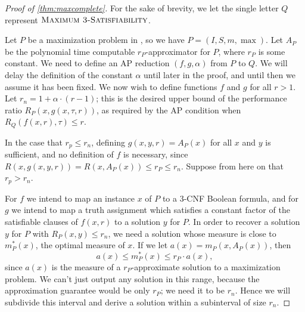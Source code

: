 \documentclass[]{article}
\theoremstyle{plain}
\theoremstyle{definition}
\begin{document}
\begin{proof}[Proof of \autoref{thm:maxcomplete}]
  For the sake of brevity, we let the single letter $Q$ represent $\textsc{Maximum 3-Satisfiability}$.

  Let $P$ be a maximization problem in \APX, so we have $P = (I, S, m, \max)$.
  Let $A_P$ be the polynomial time computable $r_P$-approximator for $P$, where $r_P$ is some constant.
  We need to define an AP reduction $(f, g, \alpha)$ from $P$ to $Q$.
  We will delay the definition of the constant $\alpha$ until later in the proof, and until then we assume it has been fixed.
  We now wish to define functions $f$ and $g$ for all $r > 1$.
  Let $r_n = 1 + \alpha \cdot (r - 1)$; this is the desired upper bound of the performance ratio $R_P(x, g(x, \tau, r))$, as required by the AP condition when $R_Q(f(x, r), \tau) \leq r$.

  In the case that $r_p \leq r_n$, defining $g(x, y, r) = A_P(x)$ for all $x$ and $y$ is sufficient, and no definition of $f$ is necessary, since $R(x, g(x, y, r)) = R(x, A_P(x)) \leq r_P \leq r_n$.
  Suppose from here on that $r_p > r_n$.

  For $f$ we intend to map an instance $x$ of $P$ to a 3-CNF Boolean formula, and for $g$ we intend to map a truth assignment which satisfies a constant factor of the satisfiable clauses of $f(x, r)$ to a solution $y$ for $P$.
  In order to recover a solution $y$ for $P$ with $R_P(x, y) \leq r_n$, we need a solution whose measure is close to $m^*_P(x)$, the optimal measure of $x$.
  If we let $a(x) = m_P(x, A_P(x))$, then
  \begin{equation}\label{eq:bounds}
    a(x) \leq m^*_P(x) \leq r_P \cdot a(x),
  \end{equation}
  since $a(x)$ is the measure of a $r_P$-approximate solution to a maximization problem.
  We can't just output any solution in this range, because the approximation guarantee would be only $r_P$; we need it to be $r_n$.
  Hence we will subdivide this interval and derive a solution within a subinterval of size $r_n$.


\end{proof}
\end{document}
